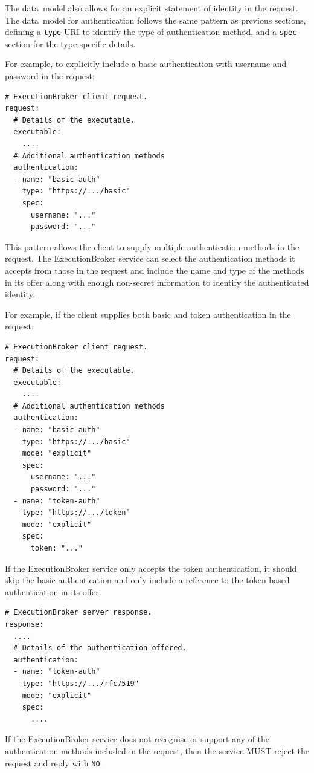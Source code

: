 \documentclass[11pt,a4paper]{ivoa}
\newcommand{\datamodel} {data~model}
\newcommand{\execbrokerclass} {ExecutionBroker}
\newcommand{\codeword}[1] {\texttt{#1}}
\begin{document}
The \datamodel{} also allows for an explicit statement of identity in the request.
The \datamodel{} for authentication follows the same pattern as previous sections,
defining a \codeword{type} URI to identify the type of authentication method,
and a \codeword{spec} section for the type specific details.

For example, to explicitly include a basic authentication with username and password
in the request:
\begin{lstlisting}[]
# ExecutionBroker client request.
request:
  # Details of the executable.
  executable:
    ....
  # Additional authentication methods
  authentication:
  - name: "basic-auth"
    type: "https://.../basic"
    spec:
      username: "..."
      password: "..."
\end{lstlisting}

This pattern allows the client to supply multiple authentication methods
in the request. The \execbrokerclass{} service can select the authentication
methods it accepts from those in the request and include the name and
type of the methods in its offer along with enough non-secret
information to identify the authenticated identity.

For example, if the client supplies both basic and token authentication
in the request:
\begin{lstlisting}[]
# ExecutionBroker client request.
request:
  # Details of the executable.
  executable:
    ....
  # Additional authentication methods
  authentication:
  - name: "basic-auth"
    type: "https://.../basic"
    mode: "explicit"
    spec:
      username: "..."
      password: "..."
  - name: "token-auth"
    type: "https://.../token"
    mode: "explicit"
    spec:
      token: "..."
\end{lstlisting}

If the \execbrokerclass{} service only accepts the token authentication, it should
skip the basic authentication and only include a reference to the token
based authentication in its offer.

\begin{lstlisting}[]
# ExecutionBroker server response.
response:
  ....
  # Details of the authentication offered.
  authentication:
  - name: "token-auth"
    type: "https://.../rfc7519"
    mode: "explicit"
    spec:
      ....
\end{lstlisting}

If the \execbrokerclass{} service does not recognise or support any of the authentication methods
included in the request, then the service MUST reject the request and reply with \codeword{NO}.
\end{document}
